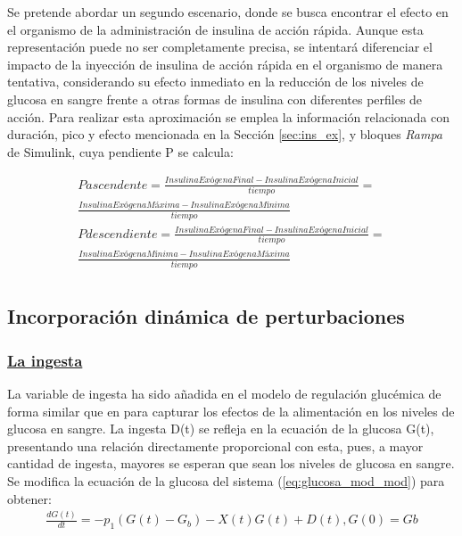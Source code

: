 Se pretende abordar un segundo escenario, donde se busca encontrar el efecto en el organismo de la administración de insulina de acción rápida. Aunque esta representación puede no ser completamente precisa, se intentará diferenciar el impacto de la inyección de insulina de acción rápida en el organismo de manera tentativa, considerando su efecto inmediato en la reducción de los niveles de glucosa en sangre frente a otras formas de insulina con diferentes perfiles de acción. Para realizar esta aproximación se emplea la información relacionada con duración, pico y efecto mencionada en la Sección \ref{sec:ins_ex}, y bloques \textit{Rampa} de Simulink, cuya pendiente P se calcula:
\clearpage
\begin{small}
\begin{align}
    P ascendente = \frac{Insulina Exógena Final-Insulina Exógena Inicial}{tiempo}= \\
    \frac{Insulina Exógena Máxima-Insulina Exógena Mínima}{tiempo}\\
    P descendiente = \frac{Insulina Exógena Final-Insulina Exógena Inicial}{tiempo}=\\
    \frac{Insulina Exógena Mínima-Insulina Exógena Máxima}{tiempo}\\
\end{align}
\end{small}

\subsection{Incorporación dinámica de perturbaciones}

\subsubsection{\underline{La ingesta}}

La variable de ingesta ha sido añadida en el modelo de regulación glucémica de forma similar que en \cite{tarin2021modelo} para capturar los efectos de la alimentación en los niveles de glucosa en sangre. La ingesta D(t) se refleja en la ecuación de la glucosa G(t), presentando una relación directamente proporcional con esta, pues, a mayor cantidad de ingesta, mayores se esperan que sean los niveles de glucosa en sangre. Se modifica la ecuación de la glucosa del sistema (\ref{eq:glucosa_mod_mod}) para obtener:
\begin{align}
    \frac{dG(t)}{dt}= -p_1 (G(t) - G_b) - X(t)G(t)+D(t), G(0)=Gb \label{eq:glucosa_ingesta_bergm}
\end{align}

